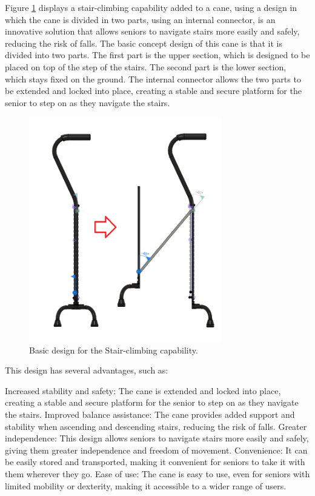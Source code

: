 \documentclass[12pt, twoside]{report}
\begin{document}
Figure \ref{fig:cane2} displays a stair-climbing capability added to a cane, using a design in which the cane is divided in two parts, using an internal connector, is an innovative solution that allows seniors to navigate stairs more easily and safely, reducing the risk of falls. The basic concept design of this cane is that it is divided into two parts. The first part is the upper section, which is designed to be placed on top of the step of the stairs. The second part is the lower section, which stays fixed on the ground. The internal connector allows the two parts to be extended and locked into place, creating a stable and secure platform for the senior to step on as they navigate the stairs.

\begin{figure}[!h]
    \centering
    \includegraphics[width=0.75\textwidth]{images/Project 3/stairs.png}
    \caption{Basic design for the Stair-climbing capability.}
    \label{fig:cane2}
\end{figure}

This design has several advantages, such as:

Increased stability and safety: The cane is extended and locked into place, creating a stable and secure platform for the senior to step on as they navigate the stairs.
Improved balance assistance: The cane provides added support and stability when ascending and descending stairs, reducing the risk of falls.
Greater independence: This design allows seniors to navigate stairs more easily and safely, giving them greater independence and freedom of movement.
Convenience: It can be easily stored and transported, making it convenient for seniors to take it with them wherever they go.
Ease of use: The cane is easy to use, even for seniors with limited mobility or dexterity, making it accessible to a wider range of users.
\end{document}

